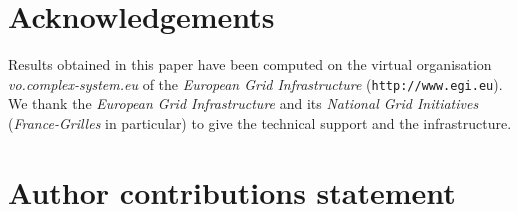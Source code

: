 \documentclass[fleqn,10pt]{wlscirep}
\begin{document}
%









%






\section*{Acknowledgements}

Results obtained in this paper have been computed on the virtual organisation \textit{vo.complex-system.eu} of the \textit{European Grid Infrastructure} (\texttt{http://www.egi.eu}). We thank the \textit{European Grid Infrastructure} and its \textit{National Grid Initiatives} (\textit{France-Grilles} in particular) to give the technical support and the infrastructure.


\section*{Author contributions statement}
\end{document}
